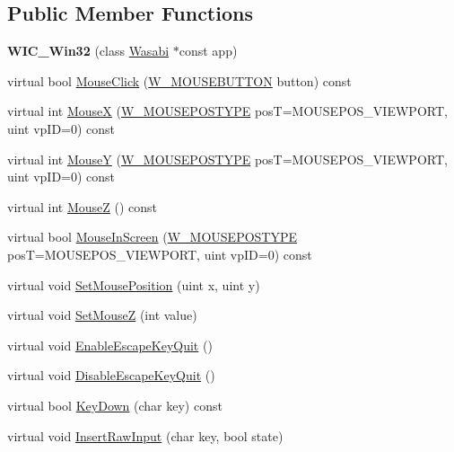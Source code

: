 \subsection*{Public Member Functions}
\begin{DoxyCompactItemize}
\item 
{\bfseries W\+I\+C\+\_\+\+Win32} (class \hyperlink{class_wasabi}{Wasabi} $\ast$const app)\hypertarget{class_w_i_c___win32_a3d5e6dffa7c825bcf6838e929c504342}{}\label{class_w_i_c___win32_a3d5e6dffa7c825bcf6838e929c504342}

\item 
virtual bool \hyperlink{class_w_i_c___win32_a76c23556cae862984355bb41e0619329}{Mouse\+Click} (\hyperlink{group__engineclass_ga9e78ddd4770694b21c0d4b852e9c800e}{W\+\_\+\+M\+O\+U\+S\+E\+B\+U\+T\+T\+ON} button) const 
\item 
virtual int \hyperlink{class_w_i_c___win32_a6a23f02b5dfa96eb677e3550116ea5bd}{MouseX} (\hyperlink{group__engineclass_ga6b8628ac07d789a9caf635eb23728d04}{W\+\_\+\+M\+O\+U\+S\+E\+P\+O\+S\+T\+Y\+PE} posT=M\+O\+U\+S\+E\+P\+O\+S\+\_\+\+V\+I\+E\+W\+P\+O\+RT, uint vp\+ID=0) const 
\item 
virtual int \hyperlink{class_w_i_c___win32_a20af1748ced72a50a96e20c09412cbfe}{MouseY} (\hyperlink{group__engineclass_ga6b8628ac07d789a9caf635eb23728d04}{W\+\_\+\+M\+O\+U\+S\+E\+P\+O\+S\+T\+Y\+PE} posT=M\+O\+U\+S\+E\+P\+O\+S\+\_\+\+V\+I\+E\+W\+P\+O\+RT, uint vp\+ID=0) const 
\item 
virtual int \hyperlink{class_w_i_c___win32_ae7a2af91f7f91463290e76687f4e6e4f}{MouseZ} () const 
\item 
virtual bool \hyperlink{class_w_i_c___win32_ad5c94554e60fbb732e904fba7d45d114}{Mouse\+In\+Screen} (\hyperlink{group__engineclass_ga6b8628ac07d789a9caf635eb23728d04}{W\+\_\+\+M\+O\+U\+S\+E\+P\+O\+S\+T\+Y\+PE} posT=M\+O\+U\+S\+E\+P\+O\+S\+\_\+\+V\+I\+E\+W\+P\+O\+RT, uint vp\+ID=0) const 
\item 
virtual void \hyperlink{class_w_i_c___win32_a59f1b57a9481e27f2d01f9597c595256}{Set\+Mouse\+Position} (uint x, uint y)
\item 
virtual void \hyperlink{class_w_i_c___win32_a56fd197d80d5740d567380e1656c4040}{Set\+MouseZ} (int value)
\item 
virtual void \hyperlink{class_w_i_c___win32_a59e1ffc6e41dc6bda50fd36b3f38293b}{Enable\+Escape\+Key\+Quit} ()
\item 
virtual void \hyperlink{class_w_i_c___win32_a3f1a6bc5370d551c927f1c40f2d8dcc6}{Disable\+Escape\+Key\+Quit} ()
\item 
virtual bool \hyperlink{class_w_i_c___win32_a0944b5e7d2287bba0e0b776906d58d4b}{Key\+Down} (char key) const 
\item 
virtual void \hyperlink{class_w_i_c___win32_a50ce920eb9cf0a116c6dd3cda2a769a8}{Insert\+Raw\+Input} (char key, bool state)
\end{DoxyCompactItemize}

